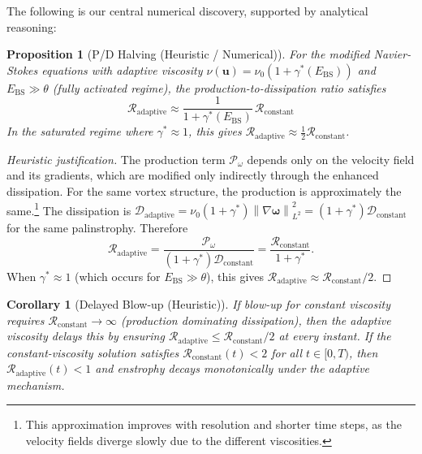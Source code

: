 \documentclass[12pt, a4paper]{article}
\newtheorem{proposition}[theorem]{Proposition}
\newtheorem{corollary}[theorem]{Corollary}
\newcommand{\norm}[1]{\left\| #1 \right\|}
\newcommand{\Ebs}{E_{\mathrm{BS}}}
\newcommand{\gammastar}{\gamma^*}
\begin{document}
The following is our central numerical discovery, supported by
analytical reasoning:

\begin{proposition}[P/D Halving (Heuristic / Numerical)]\label{thm:PD}
For the modified Navier-Stokes equations with adaptive viscosity
$\nu(\mathbf{u}) = \nu_0(1 + \gammastar(\Ebs))$ and
$\Ebs \gg \theta$ (fully activated regime),
the production-to-dissipation ratio satisfies
\begin{equation}\label{eq:PD_half}
\mathcal{R}_{\mathrm{adaptive}} \approx
\frac{1}{1 + \gammastar(\Ebs)} \, \mathcal{R}_{\mathrm{constant}}
\end{equation}
In the saturated regime where $\gammastar \approx 1$,
this gives $\mathcal{R}_{\mathrm{adaptive}} \approx \frac{1}{2}\mathcal{R}_{\mathrm{constant}}$.
\end{proposition}

\begin{proof}[Heuristic justification]
The production term $\mathcal{P}_\omega$ depends only on the velocity
field and its gradients, which are modified only indirectly through
the enhanced dissipation. For the same vortex structure, the production
is approximately the same.\footnote{This approximation improves with
resolution and shorter time steps, as the velocity fields diverge
slowly due to the different viscosities.}
The dissipation is $\mathcal{D}_{\mathrm{adaptive}} = \nu_0(1+\gammastar)
\norm{\nabla\boldsymbol{\omega}}_{L^2}^2 = (1+\gammastar)\mathcal{D}_{\mathrm{constant}}$
for the same palinstrophy.
Therefore
\[
\mathcal{R}_{\mathrm{adaptive}} = \frac{\mathcal{P}_\omega}{(1+\gammastar)\mathcal{D}_{\mathrm{constant}}}
= \frac{\mathcal{R}_{\mathrm{constant}}}{1 + \gammastar}.
\]
When $\gammastar \approx 1$ (which occurs for $\Ebs \gg \theta$),
this gives $\mathcal{R}_{\mathrm{adaptive}} \approx \mathcal{R}_{\mathrm{constant}}/2$.
\end{proof}

\begin{corollary}[Delayed Blow-up (Heuristic)]\label{cor:delay}
If blow-up for constant viscosity requires
$\mathcal{R}_{\mathrm{constant}} \to \infty$ (production dominating
dissipation), then the adaptive viscosity delays this by ensuring
$\mathcal{R}_{\mathrm{adaptive}} \leq \mathcal{R}_{\mathrm{constant}}/2$
at every instant. If the constant-viscosity solution satisfies
$\mathcal{R}_{\mathrm{constant}}(t) < 2$ for all $t \in [0,T)$,
then $\mathcal{R}_{\mathrm{adaptive}}(t) < 1$ and enstrophy
\emph{decays} monotonically under the adaptive mechanism.
\end{corollary}
\end{document}

